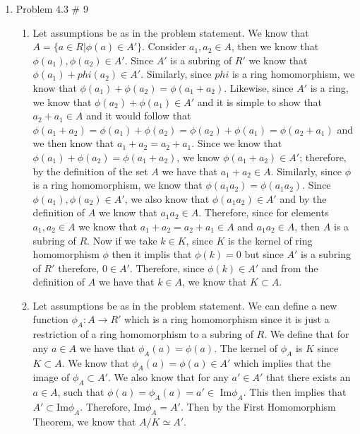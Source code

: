 \documentclass[11pt]{article}
\begin{document}
\begin{enumerate}

\item Problem 4.3 \# 9

\begin{enumerate}
    \item 
    
    Let assumptions be as in the problem statement. We know that $A=\{a\in R|\phi(a)\in A'\}$. Consider $a_1,a_2\in A$, then we know that $\phi(a_1),\phi(a_2)\in A'$. Since $A'$ is a subring of $R'$ we know that $\phi(a_1)+phi(a_2)\in A'$. Similarly, since $phi$ is a ring homomorphism, we know that $\phi(a_1)+\phi(a_2) = \phi(a_1+a_2)$. Likewise, since $A'$ is a ring, we know that $\phi(a_2)+\phi(a_1)\in A'$ and it is simple to show that $a_2+a_1\in A$ and it would follow that $\phi(a_1+a_2) = \phi(a_1)+\phi(a_2) = \phi(a_2)+\phi(a_1) = \phi(a_2+a_1)$ and we then know that $a_1+a_2 = a_2+a_1$. Since we know that $\phi(a_1)+\phi(a_2) = \phi(a_1+a_2)$, we know $\phi(a_1+a_2)\in A'$; therefore, by the definition of the set $A$ we have that $a_1+a_2\in A$. Similarly, since $\phi$ is a ring homomorphism, we know that $\phi(a_1a_2) = \phi(a_1a_2)$. Since $\phi(a_1),\phi(a_2)\in A'$, we also know that $\phi(a_1a_2)\in A'$ and by the definition of $A$ we know that $a_1a_2\in A$. Therefore, since for elements $a_1, a_2\in A$ we know that $a_1+a_2=a_2+a_1\in A$ and $a_1a_2\in A$, then $A$ is a subring of $R$. Now if we take $k\in K$, since $K$ is the kernel of ring homomorphism $\phi$ then it implis that $\phi(k)=0$ but since $A'$ is a subring of $R'$ therefore, $0\in A'$. Therefore, since $\phi(k)\in A'$ and from the definition of $A$ we have that $k\in A$, we know that $K\subset A$.
    
    \item
    
    Let assumptions be as in the problem statement. We can define a new function $\phi_A: A \rightarrow R'$ which is a ring homomorphism since it is just a restriction of a ring homomorphism to a subring of $R$. We define that for any $a\in A$ we have that $\phi_A(a) = \phi(a)$. The kernel of $\phi_A$ is $K$ since $K\subset A$. We know that $\phi_A(a) = \phi(a)\in A'$ which implies that the image of $\phi_A\subset A'$. We also know that for any $a'\in A'$ that there exists an $a\in A$, such that $\phi(a) = \phi_A(a) = a'\in$ Im$\phi_A$. This then implies that $A'\subset$Im$\phi_A$. Therefore, Im$\phi_A=A'$. Then by the First Homomorphism Theorem, we know that $A/K \simeq A'$.
    

\end{enumerate}
\end{enumerate}
\end{document}
